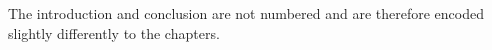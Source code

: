



The introduction and conclusion are not numbered and are therefore encoded slightly differently to the chapters.
